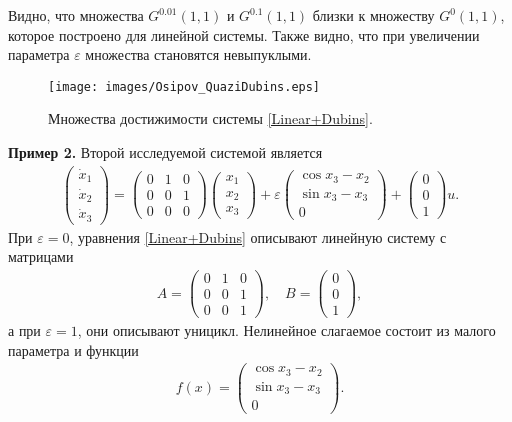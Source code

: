 \documentclass[../main.tex]{subfiles}
\begin{document}
 Видно, что множества $G^{0.01}(1,1) $ и $G^{0.1}(1,1) $ близки к множеству $G^{0}(1,1) $, которое построено для линейной системы. 
 Также видно, что при увеличении параметра $\varepsilon$ множества становятся невыпуклыми. 
 
\begin{figure}[ht]
 \centerline{
 \texttt{[image: images/Osipov\_QuaziDubins.eps]}}
 \caption{Множества достижимости системы \eqref{Linear+Dubins}.}
 \label{fig:LinearDubins}
\end{figure}
\textbf{Пример 2.}
 Второй исследуемой системой является
 \begin{gather}\label{Linear+Dubins}
 \begin{pmatrix} 
 \dot{x}_1 \\
 \dot{x}_2 \\ 
 \dot{x}_3 \end{pmatrix} = 
 \begin{pmatrix}
 0 & 1 & 0 \\
 0 & 0 & 1 \\
 0 & 0 & 0
 \end{pmatrix}
 \begin{pmatrix} 
 x_1 \\
 x_2 \\ 
 x_3 \end{pmatrix} + 
 \varepsilon
 \begin{pmatrix}
 \cos x_3 - x_2\\
 \sin x_3 - x_3 \\
 0
 \end{pmatrix} + 
 \begin{pmatrix}
 0 \\ 0 \\ 1
 \end{pmatrix} u.
 \end{gather}
 При $\varepsilon = 0$, уравнения \eqref{Linear+Dubins} описывают линейную систему с матрицами 
 \begin{gather*}
 A = \begin{pmatrix} 0 & 1 & 0\\
 0 & 0 & 1\\ 
 0 & 0 & 1 
 \end{pmatrix}, \quad B = \begin{pmatrix}
 0\\
 0\\
 1
 \end{pmatrix},
 \end{gather*}
 а при $\varepsilon = 1$, они описывают уницикл. 
 Нелинейное слагаемое состоит из малого параметра и функции
 \begin{gather*}
 f(x) = \begin{pmatrix}
 \cos x_3 - x_2\\
 \sin x_3 - x_3 \\
 0
 \end{pmatrix}.
 \end{gather*}
 
\end{document}
